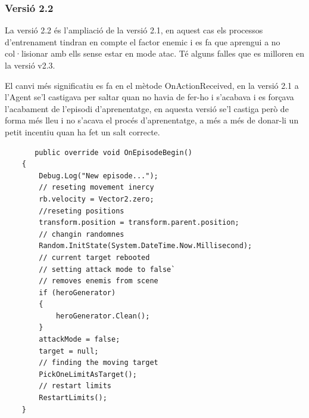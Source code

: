 \documentclass{article}
\begin{document}
    \newpage
    
     \subsubsection{Versió 2.2}
    La versió 2.2 és l'ampliació de la versió 2.1, en aquest cas els processos d'entrenament tindran en compte el factor enemic i es fa que aprengui a no col·lisionar amb ells sense estar en mode atac. Té alguns falles que es milloren en la versió v2.3.

    El canvi més significatiu es fa en el mètode OnActionReceived, en la versió 2.1 a l'Agent se'l castigava per saltar quan no havia de fer-ho i s'acabava i es forçava l'acabament de l'episodi d'aprenentatge, en aquesta versió se'l castiga però de forma més lleu i no  s'acava el procés d'aprenentatge, a més a més de donar-li un petit incentiu quan ha fet un salt correcte.
     
     \begin{lstlisting}
       public override void OnEpisodeBegin()
    {
        Debug.Log("New episode...");
        // reseting movement inercy
        rb.velocity = Vector2.zero;
        //reseting positions
        transform.position = transform.parent.position;
        // changin randomnes
        Random.InitState(System.DateTime.Now.Millisecond);
        // current target rebooted
        // setting attack mode to false`
        // removes enemis from scene
        if (heroGenerator)
        {
            heroGenerator.Clean();
        }
        attackMode = false;
        target = null;
        // finding the moving target
        PickOneLimitAsTarget();
        // restart limits
        RestartLimits();
    }
    \end{lstlisting}
    
\end{document}
